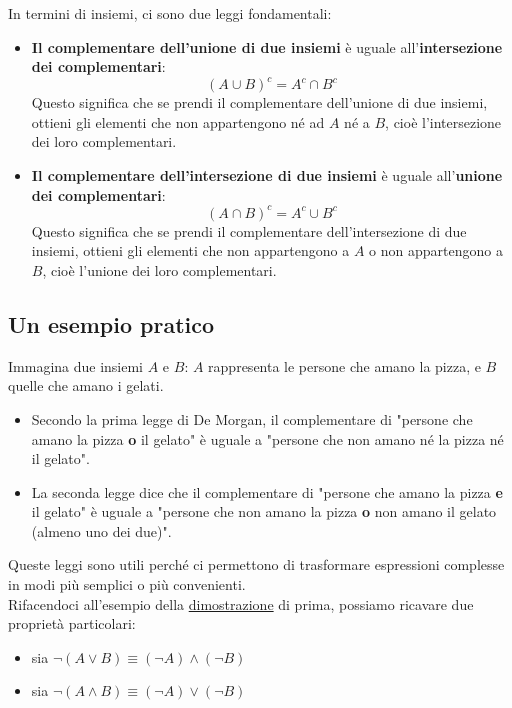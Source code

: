 \documentclass[article,12pt]{book}
\begin{document}
\begin{enumerate}
In termini di insiemi, ci sono due leggi fondamentali:

\begin{itemize}
    \item \textbf{Il complementare dell'unione di due insiemi} è uguale all'\textbf{intersezione dei complementari}:
    \[
    (A \cup B)^c = A^c \cap B^c
    \]
    Questo significa che se prendi il complementare dell'unione di due insiemi, ottieni gli elementi che non appartengono né ad $A$ né a $B$, cioè l'intersezione dei loro complementari.

    \item \textbf{Il complementare dell'intersezione di due insiemi} è uguale all'\textbf{unione dei complementari}:
    \[
    (A \cap B)^c = A^c \cup B^c
    \]
    Questo significa che se prendi il complementare dell'intersezione di due insiemi, ottieni gli elementi che non appartengono a $A$ o non appartengono a $B$, cioè l'unione dei loro complementari.
\end{itemize}

\subsection*{Un esempio pratico}
Immagina due insiemi $A$ e $B$: $A$ rappresenta le persone che amano la pizza, e $B$ quelle che amano i gelati.

\begin{itemize}
    \item Secondo la prima legge di De Morgan, il complementare di "persone che amano la pizza \textbf{o} il gelato" è uguale a "persone che non amano né la pizza né il gelato".
    
    \item La seconda legge dice che il complementare di "persone che amano la pizza \textbf{e} il gelato" è uguale a "persone che non amano la pizza \textbf{o} non amano il gelato (almeno uno dei due)".
\end{itemize}

Queste leggi sono utili perché ci permettono di trasformare espressioni complesse in modi più semplici o più convenienti. \\

Rifacendoci all'esempio della \hyperref[dimostrazione con de morgan]{dimostrazione} di prima, possiamo ricavare due proprietà particolari:
\begin{center}
    
        \begin{itemize}
            \item sia $\neg(A \lor B) \equiv (\neg A) \land (\neg B)$
            \item sia $\neg(A \land B) \equiv (\neg A) \lor (\neg B)$
        \end{itemize}
        

\end{center}
\end{enumerate}
\end{document}
